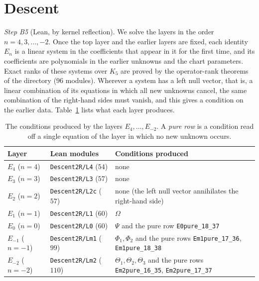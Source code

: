 \documentclass[a4paper,11pt]{article}
\newcommand{\filename}[1]{\texttt{\seqsplit{#1}}}
\let\jsOldToprule\toprule
\renewcommand{\toprule}{\jsOldToprule\rowcolor{bgheader}}
\theoremstyle{jsplain}
\theoremstyle{jsdef}
\theoremstyle{jsrem}
\begin{document}
\section{Descent}\label{bc:sec:descent}

\emph{Step B5} (Lean, by kernel reflection). We solve the layers in the order $n=4,3,\dots,-2$. Once the top layer and the earlier layers are fixed, each identity $E_n$ is a linear system in the coefficients that appear in it for the first time, and its coefficients are polynomials in the earlier unknowns and the chart parameters. Exact ranks of these systems over $K_5$ are proved by the operator-rank theorems of the directory \filename{Jacobian/BranchC/Rank/} ($96$ modules). Wherever a system has a left null vector, that is, a linear combination of its equations in which all new unknowns cancel, the same combination of the right-hand sides must vanish, and this gives a condition on the earlier data. Table~\ref{bc:tab:descent} lists what each layer produces.

\begin{table}[htbp]
\centering
\small
\begin{tabular}{ll>{\raggedright\arraybackslash}p{}}
\toprule
Layer & Lean modules & Conditions produced \\
\midrule
$E_4$ ($n=4$) & \texttt{Descent2R/L4} ($54$) & none \\
$E_3$ ($n=3$) & \texttt{Descent2R/L3} ($57$) & none \\
$E_2$ ($n=2$) & \texttt{Descent2R/L2c} ($57$) & none (the left null vector annihilates the right-hand side) \\
$E_1$ ($n=1$) & \texttt{Descent2R/L1} ($60$) & $\Omega$ \\
$E_0$ ($n=0$) & \texttt{Descent2R/L0} ($60$) & $\Psi$ and the pure row \texttt{E0pure\_\allowbreak{}18\_\allowbreak{}37} \\
$E_{-1}$ ($n=-1$) & \texttt{Descent2R/Lm1} ($99$) & $\Phi_1,\Phi_2$ and the pure rows \texttt{Em1pure\_\allowbreak{}17\_\allowbreak{}36}, \texttt{Em1pure\_\allowbreak{}18\_\allowbreak{}38} \\
$E_{-2}$ ($n=-2$) & \texttt{Descent2R/Lm2} ($110$) & $\Theta_1,\Theta_2,\Theta_3$ and the pure rows \texttt{Em2pure\_\allowbreak{}16\_\allowbreak{}35}, \texttt{Em2pure\_\allowbreak{}17\_\allowbreak{}37} \\
\bottomrule
\end{tabular}
\caption{The conditions produced by the layers $E_4,\dots,E_{-2}$. A \emph{pure row} is a condition read off a single equation of the layer in which no new unknown occurs.}
\label{bc:tab:descent}
\end{table}
\end{document}
